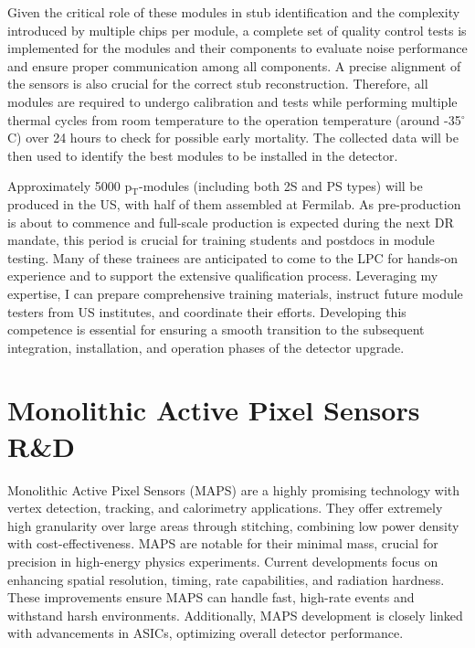 {\begin{flushleft}
Given the critical role of these modules in stub identification and the complexity introduced by multiple chips per module, a complete set of quality control tests is implemented for the modules and their components to evaluate noise performance and ensure proper communication among all components. A precise alignment of the sensors is also crucial for the correct stub reconstruction. Therefore, all modules are required to undergo calibration and tests while performing multiple thermal cycles from room temperature to the operation temperature (around -35$^{\circ}$C) over 24 hours to check for possible early mortality. The collected data will be then used to identify the best modules to be installed in the detector.
 
Approximately 5000 p$_{\mathrm{T}}$-modules (including both 2S and PS types) will be produced in the US, with half of them assembled at Fermilab. As pre-production is about to commence and full-scale production is expected during the next DR mandate, this period is crucial for training students and postdocs in module testing. Many of these trainees are anticipated to come to the LPC for hands-on experience and to support the extensive qualification process.
Leveraging my expertise, I can prepare comprehensive training materials, instruct future module testers from US institutes, and coordinate their efforts. Developing this competence is essential for ensuring a smooth transition to the subsequent integration, installation, and operation phases of the detector upgrade.

\vspace{\baselineskip}
\section{Monolithic Active Pixel Sensors R\&D}
\vspace{\baselineskip}
Monolithic Active Pixel Sensors (MAPS) are a highly promising technology with vertex detection, tracking, and calorimetry applications. They offer extremely high granularity over large areas through stitching, combining low power density with cost-effectiveness. MAPS are notable for their minimal mass, crucial for precision in high-energy physics experiments.
Current developments focus on enhancing spatial resolution, timing, rate capabilities, and radiation hardness. These improvements ensure MAPS can handle fast, high-rate events and withstand harsh environments. Additionally, MAPS development is closely linked with advancements in ASICs, optimizing overall detector performance.


\end{flushleft}}
